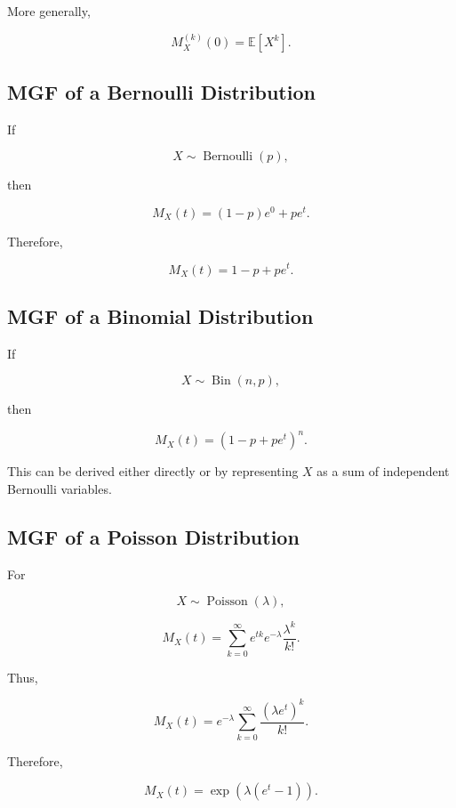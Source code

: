 More generally,

\[
\boxed{
M_X^{(k)}(0)
=
\mathbb{E}[X^k].
}
\]

\subsection{MGF of a Bernoulli Distribution}
\label{subsec:mgf-bernoulli}

If

\[
X\sim\operatorname{Bernoulli}(p),
\]

then

\[
M_X(t)
=
(1-p)e^0+pe^t.
\]

Therefore,

\[
\boxed{
M_X(t)
=
1-p+pe^t.
}
\]

\subsection{MGF of a Binomial Distribution}
\label{subsec:mgf-binomial}

If

\[
X\sim\operatorname{Bin}(n,p),
\]

then

\[
\boxed{
M_X(t)
=
(1-p+pe^t)^n.
}
\]

This can be derived either directly or by representing \(X\) as a sum
of independent Bernoulli variables.

\subsection{MGF of a Poisson Distribution}
\label{subsec:mgf-poisson}

For

\[
X\sim\operatorname{Poisson}(\lambda),
\]

\[
M_X(t)
=
\sum_{k=0}^{\infty}
e^{tk}
e^{-\lambda}
\frac{\lambda^k}{k!}.
\]

Thus,

\[
M_X(t)
=
e^{-\lambda}
\sum_{k=0}^{\infty}
\frac{
(\lambda e^t)^k
}{
k!
}.
\]

Therefore,

\[
\boxed{
M_X(t)
=
\exp
\left(
\lambda(e^t-1)
\right).
}
\]

